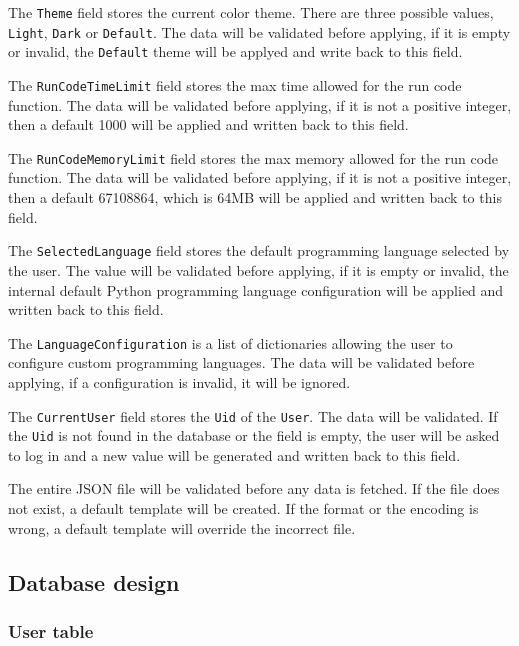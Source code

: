\documentclass[a4paper]{report}
\begin{document}
The \texttt{Theme} field stores the current color theme. There are three possible values, \texttt{Light}, \texttt{Dark} or \texttt{Default}. The data will be validated before applying, if it is empty or invalid, the \texttt{Default} theme will be applyed and write back to this field.

The \texttt{RunCodeTimeLimit} field stores the max time allowed for the run code function. The data will be validated before applying, if it is not a positive integer, then a default 1000 will be applied and written back to this field. 

The \texttt{RunCodeMemoryLimit} field stores the max memory allowed for the run code function. The data will be validated before applying, if it is not a positive integer, then a default 67108864, which is 64MB will be applied and written back to this field.

The \texttt{SelectedLanguage} field stores the default programming language selected by the user. The value will be validated before applying, if it is empty or invalid, the internal default Python programming language configuration will be applied and written back to this field.

The \texttt{LanguageConfiguration} is a list of dictionaries allowing the user to configure custom programming languages. The data will be validated before applying, if a configuration is invalid, it will be ignored.

The \texttt{CurrentUser} field stores the \texttt{Uid} of the \texttt{User}. The data will be validated. If the \texttt{Uid} is not found in the database or the field is empty, the user will be asked to log in and a new value will be generated and written back to this field.

The entire JSON file will be validated before any data is fetched. If the file does not exist, a default template will be created. If the format or the encoding is wrong, a default template will override the incorrect file.

\subsection{Database design}
\label{subsec:database design}

\subsubsection{User table}
\end{document}
